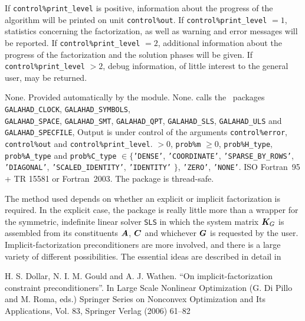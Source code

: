 \documentclass{galahad}
\newcommand{\packagename}{SBLS}
\begin{document}

\galinfo
If {\tt control\%print\_level} is positive, information about the progress
of the algorithm will be printed on unit {\tt control\-\%out}.
If {\tt control\%print\_level} $= 1$, statistics concerning the factorization,
as well as warning and error messages will be reported.
If {\tt control\%print\_level} $= 2$, additional information about the
progress of the factorization and the solution phases will be given.
If {\tt control\%print\_level} $> 2$, debug information, of little
interest to the general user, may be returned.


\galgeneral

\galcommon None.
\galworkspace Provided automatically by the module.
\galroutines None.
\galmodules {\tt \packagename\_solve} calls the \galahad\ packages
{\tt GALAHAD\_CLOCK},
{\tt GALAHAD\_SY\-M\-BOLS}, \\
{\tt GALAHAD\-\_SPACE},
{\tt GALAHAD\_SMT},
{\tt GALAHAD\_QPT},
{\tt GALAHAD\_SLS},
{\tt GALAHAD\_ULS} and
{\tt GALAHAD\_SPECFILE},
\galio Output is under control of the arguments
 {\tt control\%error}, {\tt control\%out} and {\tt control\%print\_level}.
 $> 0$, {\tt prob\%m} $\geq  0$,
{\tt prob\%H\_type}, {\tt prob\%A\_type}
and {\tt prob\%C\_type} $\in \{${\tt 'DENSE'},
 {\tt 'COORDINATE'}, {\tt 'SPARSE\_BY\_ROWS'}, {\tt 'DIAGONAL'},
 {\tt 'SCALED\_IDENTITY'}, {\tt 'IDENTITY'} $\}$,
 {\tt 'ZERO'}, {\tt 'NONE'}.
\galportability ISO Fortran~95 + TR 15581 or Fortran~2003.
The package is thread-safe.


\galmethod
The method used depends on whether an explicit or implicit
factorization is required. In the explicit case, the
package is really little more than a wrapper for the
symmetric, indefinite linear solver {\tt SLS} in
which the system matrix ${\bm{K}}_G$ is assembled from its constituents
${\bm{A}}$, ${\bm{C}}$ and whichever ${\bm{G}}$ is requested by the user.
Implicit-factorization preconditioners are more involved,
and there is a large variety of different possibilities. The
essential ideas are described in detail in
\vspace*{1mm}

\noindent
H. S. Dollar, N. I. M. Gould and A. J. Wathen.
``On implicit-factorization constraint preconditioners''.
In  Large Scale Nonlinear Optimization (G. Di Pillo and M. Roma, eds.)
Springer Series on Nonconvex Optimization and Its Applications, Vol. 83,
Springer Verlag (2006) 61--82
\end{document}
